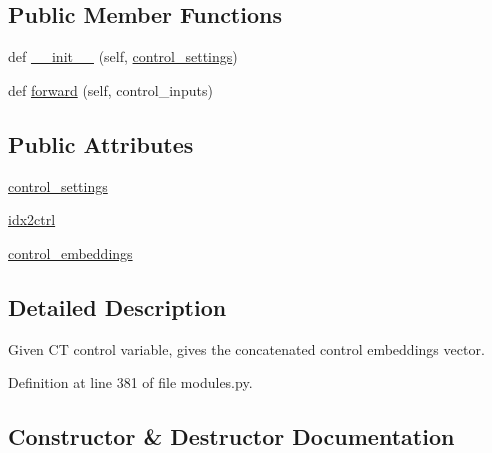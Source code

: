 \subsection*{Public Member Functions}
\begin{DoxyCompactItemize}
\item 
def \hyperlink{classcontrollable__seq2seq_1_1modules_1_1ControlEncoder_a149fcfacc8604ffc6117e89aa14225c0}{\+\_\+\+\_\+init\+\_\+\+\_\+} (self, \hyperlink{classcontrollable__seq2seq_1_1modules_1_1ControlEncoder_ada06d98cdb802bdc1a1ee58d7a2500f8}{control\+\_\+settings})
\item 
def \hyperlink{classcontrollable__seq2seq_1_1modules_1_1ControlEncoder_ae678ed4e13762eb620c918f32de0ca11}{forward} (self, control\+\_\+inputs)
\end{DoxyCompactItemize}
\subsection*{Public Attributes}
\begin{DoxyCompactItemize}
\item 
\hyperlink{classcontrollable__seq2seq_1_1modules_1_1ControlEncoder_ada06d98cdb802bdc1a1ee58d7a2500f8}{control\+\_\+settings}
\item 
\hyperlink{classcontrollable__seq2seq_1_1modules_1_1ControlEncoder_a424e293e34037eef998d7281f82d7d6c}{idx2ctrl}
\item 
\hyperlink{classcontrollable__seq2seq_1_1modules_1_1ControlEncoder_a332c9792eac6f124ed071429fb4403ff}{control\+\_\+embeddings}
\end{DoxyCompactItemize}


\subsection{Detailed Description}
\begin{DoxyVerb}Given CT control variable, gives the concatenated control embeddings vector.\end{DoxyVerb}
 

Definition at line 381 of file modules.\+py.



\subsection{Constructor \& Destructor Documentation}
\mbox{\label{classcontrollable__seq2seq_1_1modules_1_1ControlEncoder_a149fcfacc8604ffc6117e89aa14225c0}} 
